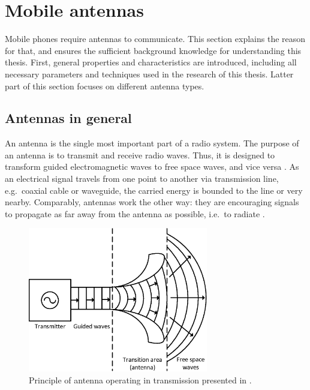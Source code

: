 \section{Mobile antennas}
\label{sec:mobile_antennas}
Mobile phones require antennas to communicate. This section explains the reason for that, and ensures the sufficient background knowledge for understanding this thesis. First, general properties and characteristics are introduced, including all necessary parameters and techniques used in the research of this thesis. Latter part of this section focuses on different antenna types.

\subsection{Antennas in general}
\label{sec:general_antennas}
An antenna is the single most important part of a radio system. The purpose of an antenna is to transmit and receive radio waves. Thus, it is designed to transform guided electromagnetic waves to free space waves, and vice versa \cite{holopainen_phd}. As an electrical signal travels from one point to another via transmission line, e.g.\ coaxial cable or waveguide, the carried energy is bounded to the line or very nearby. Comparably, antennas work the other way: they are encouraging signals to propagate as far away from the antenna as possible, i.e.\ to radiate \cite{stutzman}.

\begin{figure}[H]
    \centering
    \includegraphics[width=0.7\textwidth]{img/antenna_principle.eps}
    \caption{Principle of antenna operating in transmission presented in \cite{saunders}.}
    \label{fig:antenna_principle}
\end{figure}

